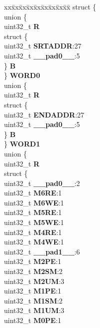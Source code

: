 \begin{DoxyCompactItemize}
\begin{tabbing}
\end{tabbing}\item 
\mbox{\label{structMPU__tag_a44b58ed5562c3ccc27c1595f2ca6202f}} 
\begin{tabbing}
xx\=xx\=xx\=xx\=xx\=xx\=xx\=xx\=xx\=\kill
struct \{\\
\>union \{\\
\>\>uint32\_t {\bfseries R}\\
\>\>struct \{\\
\>\>\>uint32\_t {\bfseries SRTADDR}:27\\
\>\>\>uint32\_t {\bfseries \_\_pad0\_\_}:5\\
\>\>\} {\bfseries B}\\
\>\} {\bfseries WORD0}\\
\>union \{\\
\>\>uint32\_t {\bfseries R}\\
\>\>struct \{\\
\>\>\>uint32\_t {\bfseries ENDADDR}:27\\
\>\>\>uint32\_t {\bfseries \_\_pad0\_\_}:5\\
\>\>\} {\bfseries B}\\
\>\} {\bfseries WORD1}\\
\>union \{\\
\>\>uint32\_t {\bfseries R}\\
\>\>struct \{\\
\>\>\>uint32\_t {\bfseries \_\_pad0\_\_}:2\\
\>\>\>uint32\_t {\bfseries M6RE}:1\\
\>\>\>uint32\_t {\bfseries M6WE}:1\\
\>\>\>uint32\_t {\bfseries M5RE}:1\\
\>\>\>uint32\_t {\bfseries M5WE}:1\\
\>\>\>uint32\_t {\bfseries M4RE}:1\\
\>\>\>uint32\_t {\bfseries M4WE}:1\\
\>\>\>uint32\_t {\bfseries \_\_pad1\_\_}:6\\
\>\>\>uint32\_t {\bfseries M2PE}:1\\
\>\>\>uint32\_t {\bfseries M2SM}:2\\
\>\>\>uint32\_t {\bfseries M2UM}:3\\
\>\>\>uint32\_t {\bfseries M1PE}:1\\
\>\>\>uint32\_t {\bfseries M1SM}:2\\
\>\>\>uint32\_t {\bfseries M1UM}:3\\
\>\>\>uint32\_t {\bfseries M0PE}:1\\

\end{tabbing}
\end{DoxyCompactItemize}
